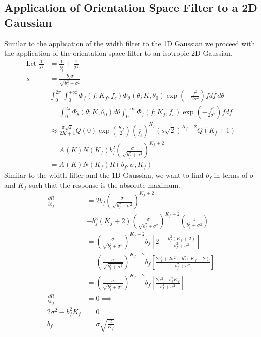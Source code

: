 \documentclass{article}
\begin{document}
\subsection{Application of Orientation Space Filter to a 2D Gaussian}
Similar to the application of the width filter to the 1D Gaussian we proceed with the application of the orientation space filter to an isotropic 2D Gaussian.
\begin{align}
\mbox{Let } \frac{1}{s^2}  &=  \frac{1}{b_f^2} + \frac{1}{\sigma^2} \\
s  &=  \frac{b_f \sigma}{\sqrt{b_f^2 + \sigma^2}} \\
&	\int_0^{2 \pi} \int_0^{+\infty} \Phi_f(f; K_f, f_c) \Phi_\theta(\theta; K, \theta_0) \exp\left(-\frac{f^2}{2\sigma^2}\right)f df \, d\theta \\
& = \int_0^{2 \pi} \Phi_\theta(\theta; K, \theta_0) d\theta
 \int_0^{+\infty} \Phi_f(f; K_f, f_c) \exp\left(-\frac{f^2}{2\sigma^2}\right)  f df \\
& \approx \frac{\pi \sqrt{2}}{2K+1}  Q(0)
 \exp \left(\frac{K_f}{2} \right)
            \left( \frac{1}{f_c} \right)^{K_f}
            \left( s \sqrt{2} \right)^{K_f+2}
            Q(K_f + 1) \\
&	    =   A(K) N(K_f) b_f^2 \left( \frac{ \sigma}{\sqrt{b_f^2 + \sigma^2}} \right)^{K_f+2} \\
&	    =   A(K) N(K_f) R(b_f, \sigma, K_f)
\end{align}
Similar to the width filter and the 1D Gaussian, we want to find $ b_f $ in terms of $ \sigma $ and $ K_f $ such that the response is the absolute maximum.
\begin{align}
	\frac{\partial R}{\partial b_f} &= 2 b_f \left( \frac{ \sigma}{\sqrt{b_f^2 + \sigma^2}} \right)^{K_f+2} \\
	&- b_f^3 (K_f+2)  \left( \frac{ \sigma}{\sqrt{b_f^2 + \sigma^2}} \right)^{K_f+2} \left( \frac{1}{b_f^2 + \sigma^2} \right) \\
	&= \left( \frac{ \sigma}{\sqrt{b_f^2 + \sigma^2}} \right)^{K_f+2} b_f \left[ 2 - \frac{b_f^2 (K_f+2)}{b_f^2 + \sigma^2} \right] \\
	&= \left( \frac{ \sigma}{\sqrt{b_f^2 + \sigma^2}} \right)^{K_f+2} b_f \left[ \frac{2b_f^2 + 2\sigma^2 - b_f^2 (K_f+2)}{b_f^2 + \sigma^2} \right] \\
	&= \left( \frac{ \sigma}{\sqrt{b_f^2 + \sigma^2}} \right)^{K_f+2} b_f \left[ \frac{2\sigma^2 -b_f^2 K_f }{b_f^2 + \sigma^2 } \right] \\
\frac{\partial R}{\partial b_f} &= 0 \implies \\
2\sigma^2 - b_f^2 K_f &= 0 \\
b_f &= \sigma \sqrt{ \frac{2}{K_f} }
\end{align}
\end{document}
